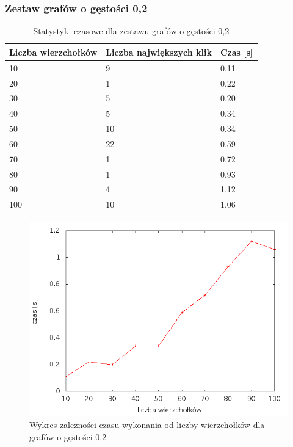 \documentclass[12pt, a4paper]{article}
\begin{document}
\subsubsection*{Zestaw grafów o gęstości 0,2}
\begin{table}[H]
\caption{Statystyki czasowe dla zestawu grafów o gęstości 0,2}
\begin{center}
    \begin{tabular}{|l|l|l|}
    \hline
    Liczba wierzchołków & Liczba największych klik & Czas [s] \\ \hline
    10 & 9 & 0.11 \\ \hline
    20 & 1 & 0.22 \\ \hline
    30 & 5 & 0.20 \\ \hline
    40 & 5 & 0.34 \\ \hline
    50 & 10 & 0.34 \\ \hline
    60 & 22 & 0.59 \\ \hline
    70 & 1 & 0.72 \\ \hline
    80 & 1 & 0.93 \\ \hline
    90 & 4 & 1.12 \\ \hline
    100 & 10 & 1.06 \\ \hline
    \end{tabular}
\end{center}
\end{table}

\begin{figure}[h]
    \begin{center}
	\includegraphics[scale=0.5]{results/img/den/den_02.png}
	\caption{Wykres zależności czasu wykonania od liczby wierzchołków dla grafów o gęstości 0,2}
    \end{center}
\end{figure}
\end{document}

